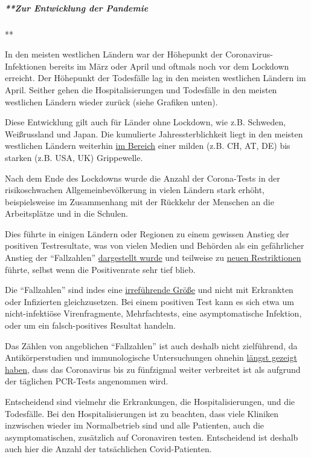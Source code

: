 \hypertarget{zur-entwicklung-der-pandemie}{%
\subparagraph{**Zur Entwicklung der
Pandemie}\label{zur-entwicklung-der-pandemie}}

**

In den meisten westlichen Ländern war der Höhepunkt der
Coronavirus-Infektionen bereits im März oder April und oftmals noch vor
dem Lockdown erreicht. Der Höhepunkt der Todesfälle lag in den meisten
westlichen Ländern im April. Seither gehen die Hospitalisierungen und
Todesfälle in den meisten westlichen Ländern wieder zurück (siehe
Grafiken unten).

Diese Entwicklung gilt auch für Länder ohne Lockdown, wie z.B. Schweden,
Weißrussland und Japan. Die kumulierte Jahressterblichkeit liegt in den
meisten westlichen Ländern weiterhin
\href{https://swprs.org/studies-on-covid-19-lethality/\#overall-mortality}{im
Bereich} einer milden (z.B. CH, AT, DE) bis starken (z.B. USA, UK)
Grippewelle.

Nach dem Ende des Lockdowns wurde die Anzahl der Corona-Tests in der
risikoschwachen Allgemeinbevölkerung in vielen Ländern stark erhöht,
beispielsweise im Zusammenhang mit der Rückkehr der Menschen an die
Arbeitsplätze und in die Schulen.

Dies führte in einigen Ländern oder Regionen zu einem gewissen Anstieg
der positiven Testresultate, was von vielen Medien und Behörden als ein
gefährlicher Anstieg der ``Fallzahlen''
\href{https://www.infosperber.ch/Artikel/Gesundheit/Corona-Viele-grosse-Medien-ubertreiben-noch-immer-massiv}{dargestellt
wurde} und teilweise zu
\href{https://www.zeitpunkt.ch/index.php/die-zweite-welle-keine-wissenschaft-kaum-kranke-aber-mehr-einschraenkungen}{neuen
Restriktionen} führte, selbst wenn die Positivenrate sehr tief blieb.

Die ``Fallzahlen'' sind indes eine
\href{https://swprs.org/corona-medien-propaganda/}{irreführende Größe}
und nicht mit Erkrankten oder Infizierten gleichzusetzen. Bei einem
positiven Test kann es sich etwa um nicht-infektiöse Virenfragmente,
Mehrfachtests, eine asymptomatische Infektion, oder um ein
falsch-positives Resultat handeln.

Das Zählen von angeblichen ``Fallzahlen'' ist auch deshalb nicht
zielführend, da Anti­körper­studien und immunologische Untersuchungen
ohnehin \href{https://swprs.org/studies-on-covid-19-lethality/}{längst
gezeigt haben}, dass das Coronavirus bis zu fünfzigmal weiter verbreitet
ist als aufgrund der täglichen PCR-Tests angenommen wird.

Entscheidend sind vielmehr die Erkrankungen, die Hospitalisierungen, und
die Todesfälle. Bei den Hospitalisierungen ist zu beachten, dass viele
Kliniken inzwischen wieder im Normalbetrieb sind und alle Patienten,
auch die asymptomatischen, zusätzlich auf Coronaviren testen.
Entscheidend ist deshalb auch hier die Anzahl der tatsächlichen
Covid-Patienten.

